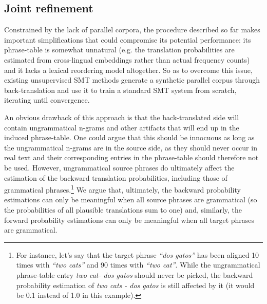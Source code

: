 \documentclass[11pt,a4paper]{article}
\begin{document}
\subsection{Joint refinement} \label{subsec:refinement}

Constrained by the lack of parallel corpora, the procedure described so far makes important simplifications that could compromise its potential performance: its phrase-table is somewhat unnatural (e.g. the translation probabilities are estimated from cross-lingual embeddings rather than actual frequency counts) and it lacks a lexical reordering model altogether. So as to overcome this issue, existing unsupervised SMT methods generate a synthetic parallel corpus through back-translation and use it to train a standard SMT system from scratch, iterating until convergence.

An obvious drawback of this approach is that the back-translated side will contain ungrammatical n-grams and other artifacts that will end up in the induced phrase-table. One could argue that this should be innocuous as long as the ungrammatical n-grams are in the source side, as they should never occur in real text and their corresponding entries in the phrase-table should therefore not be used. However, ungrammatical source phrases do ultimately affect the estimation of the backward translation probabilities, including those of grammatical phrases.\footnote{For instance, let's say that the target phrase \textit{``dos gatos''} has been aligned 10 times with \textit{``two cats''} and 90 times with \textit{``two cat''}. While the ungrammatical phrase-table entry \textit{two cat- dos gatos} should never be picked, the backward probability estimation of \textit{two cats - dos gatos} is still affected by it (it would be 0.1 instead of 1.0 in this example).} We argue that, ultimately, the backward probability estimations can only be meaningful when all source phrases are grammatical (so the probabilities of all plausible translations sum to one) and, similarly, the forward probability estimations can only be meaningful when all target phrases are grammatical.
\end{document}
